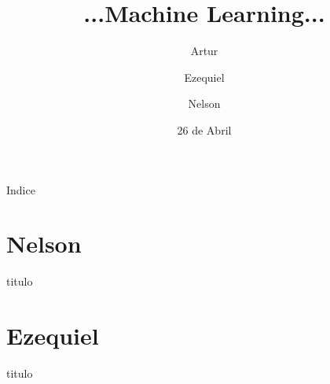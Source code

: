 \documentclass{beamer}
\title
{...Machine Learning...}
\author[Artur, Ezequiel, Nelson] 
{Artur \and Ezequiel \and Nelson}
\institute
{Universidade do Minho}
\date
{26 de Abril}
\begin{document}
\begin{frame}
  \titlepage
\end{frame}

\begin{frame}{Indice}
  \tableofcontents
\end{frame}


\section{Nelson}

\begin{frame}{titulo}
\end{frame}


\section{Ezequiel}

\begin{frame}{titulo}
\end{frame}
\end{document}
